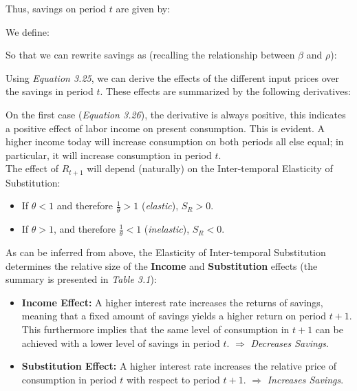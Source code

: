 \bigskip
Thus, savings on period $t$ are given by:

\bigskip
We define:

\bigskip
So that we can rewrite savings as (recalling the relationship between $\beta$ and $\rho$):

\bigskip
Using \textit{Equation 3.25}, we can derive the effects of the different input prices over the savings in period $t$. These effects are summarized by the following derivatives:

\bigskip
On the first case (\textit{Equation 3.26}), the derivative is always positive, this indicates a positive effect of labor income on present consumption. This is evident. A higher income today will increase consumption on both periods all else equal; in particular, it will increase consumption in period $t$.\\

\bigskip
The effect of $R_{t+1}$ will depend (naturally) on the Inter-temporal Elasticity of Substitution:
\begin{itemize}
\item If $\theta<1$ and therefore $\frac{1}{\theta}>1$ (\textit{elastic}), $S_R>0$. 
\item If $\theta>1$, and therefore $\frac{1}{\theta}<1$ (\textit{inelastic}), $S_R<0$. 
\end{itemize}

\bigskip
As can be inferred from above, the Elasticity of Inter-temporal Substitution determines the relative size of the \textbf{Income} and \textbf{Substitution} effects (the summary is presented in \textit{Table 3.1}):
\begin{itemize}
\item \textbf{Income Effect:} A higher interest rate increases the returns of savings, meaning that a fixed amount of savings yields a higher return on period $t+1$. This furthermore implies that the same level of consumption in $t+1$ can be achieved with a lower level of savings in period $t$.  $\Rightarrow$ \textit{Decreases Savings}.
\item \textbf{Substitution Effect:} A higher interest rate increases the relative price of consumption in period $t$ with respect to period $t+1$. $\Rightarrow$ \textit{Increases Savings}.
\end{itemize}

